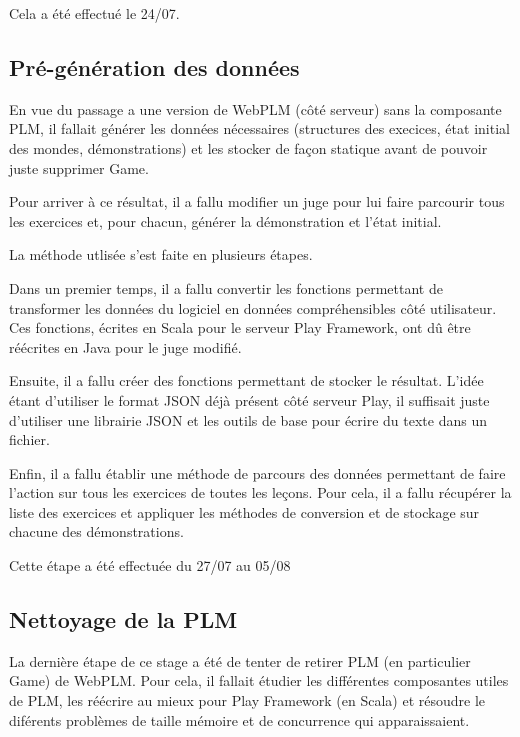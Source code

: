 \documentclass[stage]{tnreport}
\begin{document}
Cela a été effectué le 24/07.

\subsection{Pré-génération des données}

En vue du passage a une version de WebPLM (côté serveur) sans la composante PLM, il fallait générer les données nécessaires (structures des execices, état initial des mondes, démonstrations) et les stocker de façon statique avant de pouvoir juste supprimer Game.

Pour arriver à ce résultat, il a fallu modifier un juge pour lui faire parcourir tous les exercices et, pour chacun, générer la démonstration et l'état initial.

La méthode utlisée s'est faite en plusieurs étapes.

Dans un premier temps, il a fallu convertir les fonctions permettant de transformer les données du logiciel en données compréhensibles côté utilisateur. Ces fonctions, écrites en Scala pour le serveur Play Framework, ont dû être réécrites en Java pour le juge modifié.

Ensuite, il a fallu créer des fonctions permettant de stocker le résultat. L'idée étant d'utiliser le format JSON déjà présent côté serveur Play, il suffisait juste d'utiliser une librairie JSON et les outils de base pour écrire du texte dans un fichier.

Enfin, il a fallu établir une méthode de parcours des données permettant de faire l'action sur tous les exercices de toutes les leçons. Pour cela, il a fallu récupérer la liste des exercices et appliquer les méthodes de conversion et de stockage sur chacune des démonstrations.

Cette étape a été effectuée du 27/07 au 05/08

\subsection{Nettoyage de la PLM}

La dernière étape de ce stage a été de tenter de retirer PLM (en particulier Game) de WebPLM. Pour cela, il fallait étudier les différentes composantes utiles de PLM, les réécrire au mieux pour Play Framework (en Scala) et résoudre le diférents problèmes de taille mémoire et de concurrence qui apparaissaient.
\end{document}
